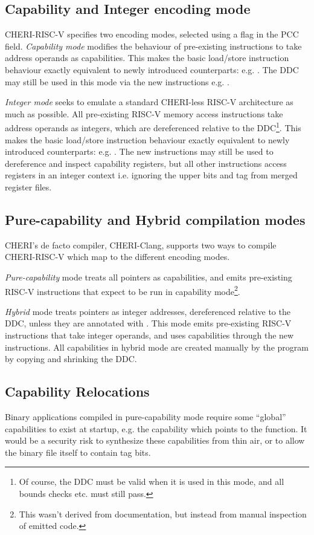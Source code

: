 \subsection{Capability and Integer encoding mode}
CHERI-RISC-V specifies two encoding modes, selected using a flag in the PCC  field.
\emph{Capability mode} modifies the behaviour of pre-existing instructions to take address operands as capabilities.
This makes the basic load/store instruction behaviour exactly equivalent to newly introduced counterparts: e.g. .
The DDC may still be used in this mode via the new instructions e.g. .

\emph{Integer mode} seeks to emulate a standard CHERI-less RISC-V architecture as much as possible.
All pre-existing RISC-V memory access instructions take address operands as integers, which are dereferenced relative to the DDC\footnote{Of course, the DDC must be valid when it is used in this mode, and all bounds checks etc. must still pass.}.
This makes the basic load/store instruction behaviour exactly equivalent to newly introduced counterparts: e.g. .
The new instructions may still be used to dereference and inspect capability registers, but all other instructions access registers in an integer context i.e. ignoring the upper bits and tag from merged register files.

\subsection{Pure-capability and Hybrid compilation modes}
CHERI's de facto compiler, CHERI-Clang\todocite{}, supports two ways to compile CHERI-RISC-V which map to the different encoding modes.

\emph{Pure-capability} mode treats all pointers as capabilities, and emits pre-existing RISC-V instructions that expect to be run in capability mode\footnote{This wasn't derived from documentation, but instead from manual inspection of emitted code.}.

\emph{Hybrid} mode treats pointers as integer addresses, dereferenced relative to the DDC, unless they are annotated with .
This mode emits pre-existing RISC-V instructions that take integer operands, and uses capabilities through the new instructions.
All capabilities in hybrid mode are created manually by the program by copying and shrinking the DDC.

\subsection{Capability Relocations}
Binary applications compiled in pure-capability mode require some ``global'' capabilities to exist at startup, e.g. the capability which points to the  function.
It would be a security risk to synthesize these capabilities from thin air, or to allow the binary file itself to contain tag bits.

